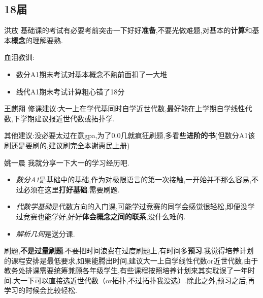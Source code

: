 \documentclass[pdf]{beamer}
\numberwithin{equation}{section}
\theoremstyle{plain}
\theoremstyle{plain}
\theoremstyle{plain}
\theoremstyle{remark}
\begin{document}
\subsection{18届}
\begin{frame}
\begin{block}{洪放}
	\hspace*{20pt}基础课的考试有必要考前突击一下好好\textbf{准备},不要光做难题,对基本的\textbf{计算}和基本\textbf{概念}的理解要熟.
	
	\hspace*{20pt}血泪教训:
	\begin{itemize}
		\item 数分A1期末考试对基本概念不熟前面扣了一大堆
		\item 线代A1期末考试计算粗心错了18分
	\end{itemize}
	
\end{block}
\begin{block}{王麒翔}
	\hspace*{20pt}修课建议:大一上在学代基同时自学近世代数,最好能在上学期自学线性代数,下学期建议报近世代数或拓扑学.
	
	\hspace*{20pt}其他建议:没必要太过在意gpa,为了0.0几就疯狂刷题,多看些\textbf{进阶的书}(但数分A1该刷还是要刷的,建议刷完全本谢惠民上册)
\end{block}
\end{frame}
\begin{frame}
\begin{block}{姚一晨}
\hspace*{20pt}我就分享一下大一的学习经历吧.
\begin{itemize}
	\item \textit{数分A1}是基础中的基础,作为对极限语言的第一次接触,一开始并不那么容易,不过必须在这里\textbf{打好基础}.需要刷题.
	\item \textit{代数学基础}是代数方向的入门课,可能学过竞赛的同学会感觉很轻松,即便没学过竞赛也能学好,好好\textbf{体会概念之间的联系},没什么难的.
	\item \textit{解析几何}是送分课.
\end{itemize}

\hspace*{20pt}刷题,\textbf{不是过量刷题}.不要把时间浪费在过度刷题上,有时间多\textbf{预习}.我觉得培养计划的课程安排是最低要求,如果能腾出时间,建议大一上自学线性代数or近世代数,由于教务处排课需要统筹兼顾各年级学生,有些课程按照培养计划来其实耽误了一年时间.大一下可以直接选近世代数（or拓扑,不过拓扑我没选）.除此之外,预习之后,再学习的时候会比较轻松.
\end{block}
\end{frame}
\end{document}
